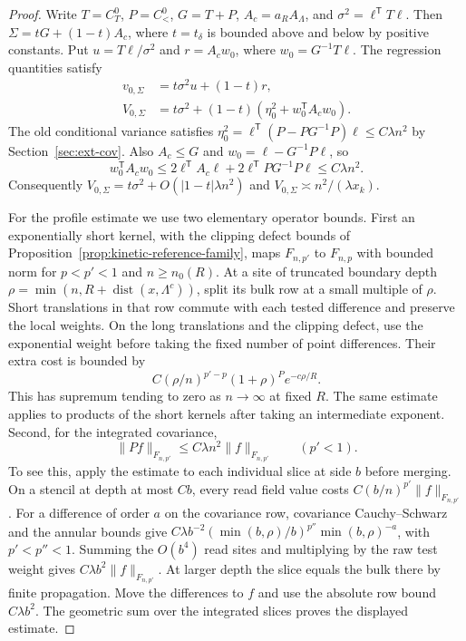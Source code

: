 \documentclass[11pt]{article}
\theoremstyle{definition}
\newcommand{\dist}{\operatorname{dist}}
\begin{document}
\begin{proof}
Write \(T=C_T^0\), \(P=C_<^0\), \(G=T+P\),
\(A_c=a_R A_\Lambda\), and \(\sigma^2=\ell^{\mathsf T}T\ell\).
Then \(\Sigma=tG+(1-t)A_c\), where \(t=t_\delta\) is bounded
above and below by positive constants. Put \(u=T\ell/\sigma^2\)
and \(r=A_c w_0\), where \(w_0=G^{-1}T\ell\).
The regression quantities satisfy
\begin{align}
 v_{0,\Sigma}&=t\sigma^2u+(1-t)r,\\
 V_{0,\Sigma}&=t\sigma^2+(1-t)
                 (\eta_0^2+w_0^{\mathsf T}A_c w_0).
\end{align}
The old conditional variance satisfies
\(\eta_0^2=\ell^{\mathsf T}(P-PG^{-1}P)\ell\le C\lambda n^2\)
by Section~\ref{sec:ext-cov}. Also \(A_c\le G\) and
\(w_0=\ell-G^{-1}P\ell\), so
\begin{equation}
 w_0^{\mathsf T}A_cw_0
 \le 2\ell^{\mathsf T}A_c\ell+2\ell^{\mathsf T}PG^{-1}P\ell
 \le C\lambda n^2 .
\end{equation}
Consequently \(V_{0,\Sigma}=t\sigma^2+O(|1-t|\lambda n^2)\)
and \(V_{0,\Sigma}\asymp n^2/(\lambda x_k)\).

For the profile estimate we use two elementary operator
bounds. First an exponentially short kernel, with the clipping
defect bounds of Proposition~\ref{prop:kinetic-reference-family},
maps \(F_{n,p'}\) to \(F_{n,p}\) with bounded norm for
\(p<p'<1\) and \(n\ge n_0(R)\). At a site of truncated boundary depth
\(\rho=\min(n,R+\dist(x,\Lambda^c))\), split its bulk row at a
small multiple of \(\rho\). Short translations in that row
commute with each tested difference and preserve the local
weights. On the long translations and the clipping defect,
use the exponential weight before taking the fixed number
of point differences. Their extra cost is bounded by
\begin{equation}
 C (\rho/n)^{p'-p}(1+\rho)^P e^{-c\rho/R}.
\end{equation}
This has supremum tending to zero as \(n\to\infty\) at
fixed \(R\). The same estimate applies to products of the
short kernels after taking an intermediate exponent.
Second, for the integrated covariance,
\begin{equation}
 \|Pf\|_{F_{n,p'}}\le C\lambda n^2\|f\|_{F_{n,p'}}
 \qquad (p'<1).
\end{equation}
To see this, apply the estimate to each individual slice at
side \(b\) before merging. On a stencil at depth at most
\(C b\), every read field value costs
\(C(b/n)^{p'}\|f\|_{F_{n,p'}}\). For a difference of order
\(a\) on the covariance row, covariance Cauchy--Schwarz
and the annular bounds give
\(C\lambda b^{-2}(\min(b,\rho)/b)^{p''}
\min(b,\rho)^{-a}\), with \(p'<p''<1\).
Summing the \(O(b^4)\) read sites and multiplying by
the raw test weight gives \(C\lambda b^2\|f\|_{F_{n,p'}}\).
At larger depth the slice equals the bulk there by finite
propagation. Move the differences to \(f\) and use the
absolute row bound \(C\lambda b^2\). The geometric sum over
the integrated slices proves the displayed estimate.


\end{proof}
\end{document}
